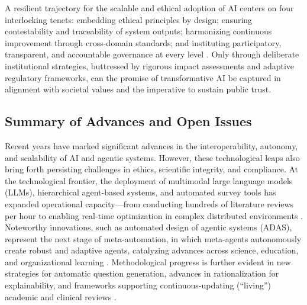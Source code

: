 A resilient trajectory for the scalable and ethical adoption of AI centers on four interlocking tenets: embedding ethical principles by design; ensuring contestability and traceability of system outputs; harmonizing continuous improvement through cross-domain standards; and instituting participatory, transparent, and accountable governance at every level \cite{ref74,ref75,ref80,ref84,ref95,ref96,ref97,ref98,ref100,ref102,ref104,ref106,ref109,ref110}. Only through deliberate institutional strategies, buttressed by rigorous impact assessments and adaptive regulatory frameworks, can the promise of transformative AI be captured in alignment with societal values and the imperative to sustain public trust.

\subsection{Summary of Advances and Open Issues}

Recent years have marked significant advances in the interoperability, autonomy, and scalability of AI and agentic systems. However, these technological leaps also bring forth persisting challenges in ethics, scientific integrity, and compliance. At the technological frontier, the deployment of multimodal large language models (LLMs), hierarchical agent-based systems, and automated survey tools has expanded operational capacity—from conducting hundreds of literature reviews per hour to enabling real-time optimization in complex distributed environments \cite{ref31,ref47,ref49,ref74,ref80,ref84,ref100,ref102,ref104}. Noteworthy innovations, such as automated design of agentic systems (ADAS), represent the next stage of meta-automation, in which meta-agents autonomously create robust and adaptive agents, catalyzing advances across science, education, and organizational learning \cite{ref31,ref34,ref35,ref47,ref49}. Methodological progress is further evident in new strategies for automatic question generation, advances in rationalization for explainability, and frameworks supporting continuous-updating (“living”) academic and clinical reviews \cite{ref74,ref84,ref100,ref102,ref104}.

